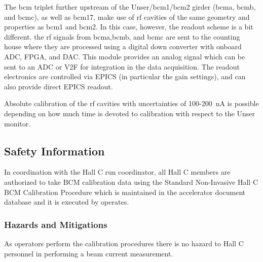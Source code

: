 {The bcm triplet further upstream of the Unser/bcm1/bcm2 girder (bcma, bcmb, and bcmc), as well as bcm17,  make use
of rf cavities of the same geometry and properties as bcm1 and bcm2. In this case,
however, the readout scheme is a bit different. the rf signals from bcma,bcmb, and bcmc are
sent to the counting house where they are processed using a digital down converter
with onboard ADC, FPGA, and DAC. This module provides an analog signal which can be
sent to an ADC or V2F for integration in the data acquisition. The readout electronics are controlled via
EPICS (in particular the gain settings), and can also provide direct EPICS readout.

Absolute calibration of the rf cavities with uncertainties of 100-200~nA is possible
depending on how much time is devoted to calibration with respect to the Unser monitor.

\begin{safetyen}{0}{0}
\subsection{Safety Information}
In coordination with the Hall C run coordinator, all Hall C members
are authorized to take BCM calibration data using the Standard
Non-Invasive Hall C BCM Calibration Procedure which is maintained in
the accelerator document database and it is executed by operates.


\subsubsection{Hazards and Mitigations}

As operators perform the calibration procedures there is no hazard to
Hall C personnel in performing a beam current measurement.


\end{safetyen}}
